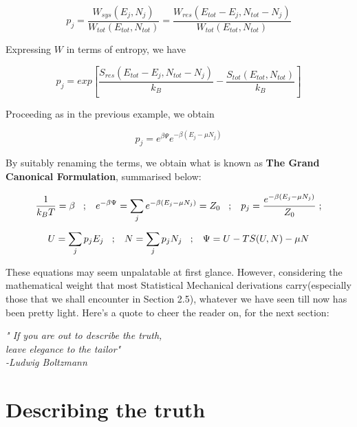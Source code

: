 \documentclass[oneside]{book}
\begin{document}
\[p_j =  \frac{W_{sys}(E_j, N_j)}{W_{tot}(E_{tot}, N_{tot})} = \frac{W_{res}(E_{tot} - E_j, N_{tot} - N_j)}{W_{tot}(E_{tot}, N_{tot})}  \]

Expressing $W$ in terms of entropy, we have

\[p_j =   exp[\frac{S_{res}{(E_{tot} - E_j, N_{tot} - N_j)}}{k_B} - \frac{S_{tot}{(E_{tot}, N_{tot})}}{k_B}]   \]

Proceeding as in the previous example, we obtain


\[p_j = e^{ \beta \Psi  }   e^{    -\beta{(E_j - \mu N_j)}   } \]

By suitably renaming the terms, we obtain what is known as \textbf{The Grand Canonical Formulation}, summarised below:
\begin{mdframed}[style=exercise]
\[\frac{1}{k_BT} = \beta
\hspace{0.3cm};\hspace{0.3cm} 
e^{-\beta \Psi} = \sum_{j}^{}e^{-\beta (E_j - \mu N_j)} =  Z_0      
\hspace{0.3cm};\hspace{0.3cm}
 p_j = \frac{e^{-\beta (E_j - \mu N_j)}}{Z_0}
\hspace{0.1cm}; 
\]
\[U = \sum_{j}^{}p_jE_j
\hspace{0.3cm};\hspace{0.3cm}
N = \sum_{j}^{}p_jN_j
\hspace{0.3cm};\hspace{0.3cm}
\Psi = U - TS(U,N) - \mu N \]
\end{mdframed}

These equations may seem unpalatable at first glance. However, considering the mathematical weight that most Statistical Mechanical derivations carry(especially those that we shall encounter in Section 2.5), whatever we have seen till now has been pretty light. Here's a quote to cheer the reader on, for the next section: \\
\begin{center}
\emph{" If you are out to describe the truth,}\\
\emph{leave elegance to the tailor"}\\
\emph{\hspace{5cm}-Ludwig Boltzmann}\\
\end{center}

\section{Describing the truth}
\end{document}
